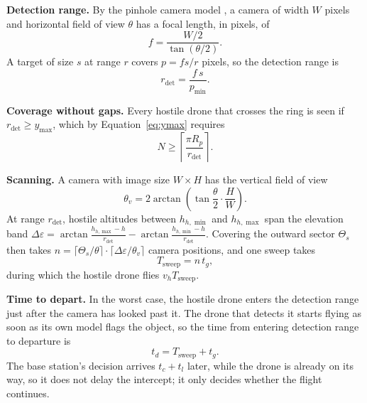 \textbf{Detection range.} By the pinhole camera model
\cite{hartley2004multiple}, a camera of width $W$ pixels and horizontal field
of view $\theta$ has a focal length, in pixels, of
\begin{equation}
  f = \frac{W/2}{\tan(\theta/2)}.
  \label{eq:focal}
\end{equation}
A target of size $s$ at range $r$ covers $p = f s / r$ pixels, so the
detection range is
\begin{equation}
  r_{\mathrm{det}} = \frac{f\,s}{p_{\min}}.
  \label{eq:rdet}
\end{equation}

\textbf{Coverage without gaps.} Every hostile drone that crosses the ring is
seen if $r_{\mathrm{det}} \geq y_{\max}$, which by Equation~\eqref{eq:ymax}
requires
\begin{equation}
  N \geq \left\lceil \frac{\pi R_p}{r_{\mathrm{det}}} \right\rceil.
  \label{eq:ncoverage}
\end{equation}

\textbf{Scanning.} A camera with image size $W \times H$ has the vertical field
of view
\begin{equation}
  \theta_v = 2\arctan\!\left(\tan\frac{\theta}{2}\cdot\frac{H}{W}\right).
  \label{eq:vfov}
\end{equation}
At range $r_{\mathrm{det}}$, hostile altitudes between $h_{h,\min}$ and
$h_{h,\max}$ span the elevation band
$\Delta\varepsilon = \arctan\frac{h_{h,\max}-h}{r_{\mathrm{det}}}
 - \arctan\frac{h_{h,\min}-h}{r_{\mathrm{det}}}$.
Covering the outward sector $\Theta_s$ then takes
$n = \lceil \Theta_s/\theta \rceil \cdot \lceil \Delta\varepsilon/\theta_v \rceil$
camera positions, and one sweep takes
\begin{equation}
  T_{\mathrm{sweep}} = n\,t_g ,
  \label{eq:sweep}
\end{equation}
during which the hostile drone flies $v_h T_{\mathrm{sweep}}$.

\textbf{Time to depart.} In the worst case, the hostile drone enters the
detection range just after the camera has looked past it. The drone that
detects it starts flying as soon as its own model flags the object, so the
time from entering detection range to departure is
\begin{equation}
  t_d = T_{\mathrm{sweep}} + t_g .
  \label{eq:delay}
\end{equation}
The base station's decision arrives $t_c + t_l$ later, while the drone is
already on its way, so it does not delay the intercept; it only decides
whether the flight continues.

